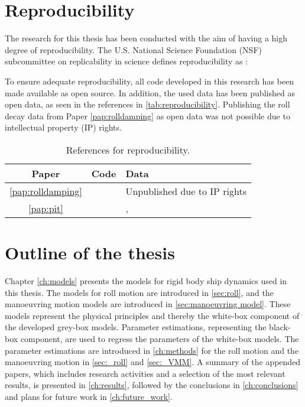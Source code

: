 \section{Reproducibility}
The research for this thesis has been conducted with the aim of having a high degree of reproducibility. The U.S. National Science Foundation (NSF) subcommittee on replicability in science defines reproducibility as \cite{bollen_social_2015}:
\begin{quote}
\vspace{0.2cm}
\vspace{0.2cm}
\end{quote}
To ensure adequate reproducibility, all code developed in this research has been made available as open source. In addition, the used data has been published as open data, as seen in the references in \autoref{tab:reproducibility}. Publishing the roll decay data from Paper \ref{pap:rolldamping} as open data was not possible due to intellectual property (IP) rights.

\begin{table}[H]
    \centering
    \caption{References for reproducibility.}
    \label{tab:reproducibility}
    \begin{tabular}{ c l l}
        \toprule
         Paper &  Code & Data \\
         \hline
         \ref{pap:rolldamping} & \textcite{alexandersson_rolldecay-estimators_2022} & Unpublished due to IP rights\\
         \ref{pap:pit} & \textcite{alexandersson_code_2022} & \textcite{alexandersson_wpcc_2022}, \textcite{stern_experience_2011} \\
         \bottomrule
    \end{tabular}
\end{table}

\section{Outline of the thesis}
Chapter \ref{ch:models} presents the models for rigid body ship dynamics used in this thesis. The models for roll motion are introduced in \autoref{sec:roll}, and the manoeuvring motion models are introduced in  \autoref{sec:manoeuvring model}. These models represent the physical principles and thereby the white-box component of the developed grey-box models.
Parameter estimations, representing the black-box component, are used to regress the parameters of the white-box models. The parameter estimations are introduced in \autoref{ch:methods} for the roll motion and the manoeuvring motion in \autoref{sec:_roll} and \autoref{sec:_VMM}. 
A summary of the appended papers, which includes research activities and a selection of the most relevant results, is presented in \autoref{ch:results}, followed by the conclusions in \autoref{ch:conclusions} and plans for future work in \autoref{ch:future_work}.